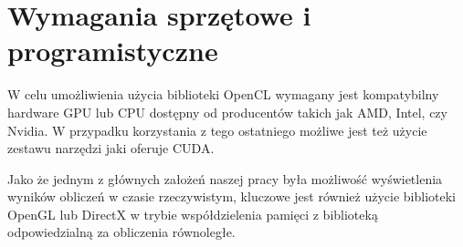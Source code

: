 \documentclass[polish, 12pt]{aghthesis}
\begin{document}
	\section{Wymagania sprzętowe i programistyczne}
		W celu umożliwienia użycia biblioteki OpenCL wymagany jest kompatybilny hardware GPU lub CPU dostępny od producentów takich jak AMD, Intel, czy Nvidia. W przypadku korzystania z tego ostatniego możliwe jest też użycie zestawu narzędzi jaki oferuje CUDA.
		
		Jako że jednym z głównych założeń naszej pracy była możliwość wyświetlenia wyników obliczeń w czasie rzeczywistym, kluczowe jest również użycie biblioteki OpenGL lub DirectX w trybie współdzielenia pamięci z biblioteką odpowiedzialną za obliczenia równoległe.
	
\end{document}
